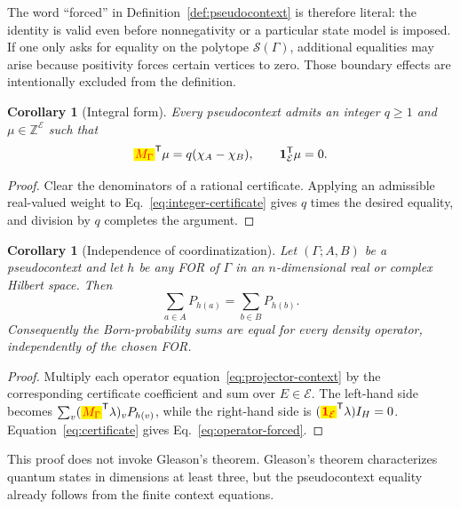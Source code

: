 \documentclass[
  twocolumn,
  aps,
  pra,
  floatfix,
  amsmath,amssymb,
  longbibliography
]{revtex4-2}
\newtheorem{corollary}[theorem]{Corollary}
\theoremstyle{definition}
\theoremstyle{remark}
\newcommand{\E}{\mathcal E}
\newcommand{\one}{\mathbf 1}
\newcommand{\corrmath}[1]{\begingroup\setlength{\fboxsep}{1pt}\colorbox{yellow}{\ensuremath{\color{red}#1}}\endgroup}
\begin{document}
The word ``forced'' in Definition~\ref{def:pseudocontext} is therefore literal: the identity is
valid even before nonnegativity or a particular state model is imposed.  If
one only asks for equality on the polytope $\mathcal S(\Gamma)$, additional
equalities may arise because positivity forces certain vertices to zero.
Those boundary effects are intentionally excluded from the definition.

\begin{corollary}[Integral form]
Every pseudocontext admits an integer $q\ge1$ and
$\mu\in\mathbb Z^{\E}$ such that
\begin{equation}
 \corrmath{M_\Gamma}^{\mathsf T}\mu=q(\chi_A-\chi_B),
 \qquad \one_\E^{\mathsf T}\mu=0.
 \label{eq:integer-certificate}
\end{equation}
\end{corollary}

\begin{proof}
Clear the denominators of a rational certificate.  Applying an admissible
real-valued weight to Eq.~\eqref{eq:integer-certificate} gives $q$ times the
desired equality, and division by $q$ completes the argument.
\end{proof}

\begin{corollary}[Independence of coordinatization]
\label{cor:coordinates}
Let $(\Gamma;A,B)$ be a pseudocontext and let $h$ be any FOR of $\Gamma$
in an $n$-dimensional real or complex Hilbert
space.  Then
\begin{equation}
 \sum_{a\in A}P_{h(a)}=\sum_{b\in B}P_{h(b)}.
 \label{eq:operator-forced}
\end{equation}
Consequently the Born-probability sums are equal for every density operator,
independently of the chosen FOR.
\end{corollary}

\begin{proof}
Multiply each operator equation~\eqref{eq:projector-context} by the
corresponding certificate coefficient and sum over $E\in\E$.  The left-hand
side becomes
$\sum_v(\corrmath{M_\Gamma}^{\mathsf T}\lambda)_vP_{h(v)}$, while the right-hand side is
$(\corrmath{\one_\E}^{\mathsf T}\lambda)I_H=0$.  Equation~\eqref{eq:certificate} gives
Eq.~\eqref{eq:operator-forced}.
\end{proof}

This proof does not invoke Gleason's theorem.  Gleason's theorem
\cite{Gleason} characterizes quantum states in dimensions at least three,
but the pseudocontext equality already follows from the finite context
equations.
\end{document}
